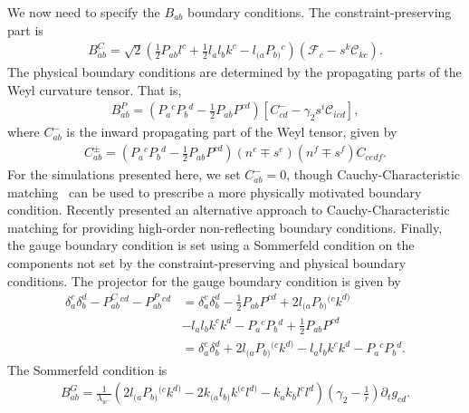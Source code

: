 \documentclass[12pt]{caltech_thesis}
\begin{document}
\begin{bibunit}[unsrtnat]
We now need to specify the $B_{ab}$ boundary conditions. The
constraint-preserving part is
\begin{eqnarray}
  \label{eq:fosh gh bc constraint preserving}
  B_{ab}^C=\sqrt{2}\left(\frac{1}{2}P_{ab}l^c + \frac{1}{2}l_al_bk^c -
  l_{(a}P_{b)}{}^c\right)\left(\mathcal{F}_c-s^k\mathcal{C}_{kc}\right).
\end{eqnarray}
The physical boundary conditions are determined by the propagating parts of the
Weyl curvature tensor. That is,
\begin{eqnarray}
  \label{eq:fosh gh bc physical}
  B_{ab}^P=\left(P_a{}^cP_b{}^d-\frac{1}{2}P_{ab}P^{cd}\right)\left[C^-_{cd}
  -\gamma_2s^i\mathcal{C}_{icd}\right],
\end{eqnarray}
where $C^-_{ab}$ is the inward propagating part of the Weyl tensor, given by
\begin{eqnarray}
  \label{eq:fosh gh weyl propagating}
  C^{\pm}_{ab}=\left(P_a{}^cP_b{}^d-\frac{1}{2}P_{ab}P^{cd}\right)\left(n^e\mp
  s^e\right)\left(n^f\mp s^f\right)C_{cedf}.
\end{eqnarray}
For the simulations presented here, we set $C^-_{ab}=0$, though
Cauchy-Characteristic matching~\cite{Ma:2023qjn} can be used to prescribe a more
physically motivated boundary condition. Recently
\cite{Buchman:2024zsb} presented an alternative approach to
Cauchy-Characteristic matching for providing high-order non-reflecting boundary
conditions. Finally, the gauge boundary condition is set using a Sommerfeld
condition on the components not set by the constraint-preserving and physical
boundary conditions. The projector for the gauge boundary condition is given by
\begin{eqnarray}
  \label{eq:fosh gh bc gauge projection}
  \delta_a^c\delta_b^d-P^{C}_{ab}{}^{cd}-P^P_{ab}{}^{cd}
  &=\delta_a^c\delta_b^d-\frac{1}{2}P_{ab}P^{cd}+2l_{(a}P_{b)}{}^{(c}k^{d)}
    \nonumber \\
  &-l_al_bk^ck^d-P_a{}^cP_b{}^d+\frac{1}{2}P_{ab}P^{cd} \nonumber \\
  &=\delta_a^c\delta_b^d+2l_{(a}P_{b)}{}^{(c}k^{d)}
    -l_al_bk^ck^d-P_a{}^cP_b{}^d.
\end{eqnarray}
The Sommerfeld condition is
\begin{eqnarray}
  \label{eq:fosh gh bc gauge}
  B_{ab}^G=\frac{1}{\lambda_{w^-}}
  \left(2l_{(a}P_{b)}{}^{(c}k^{d)} - 2k_{(a}l_{b)}k^{(c}l^{d)}
  -k_ak_bl^cl^d\right)\left(\gamma_2 - \frac{1}{r}\right)\partial_t
  g_{cd}.
\end{eqnarray}


\end{bibunit}
\end{document}
